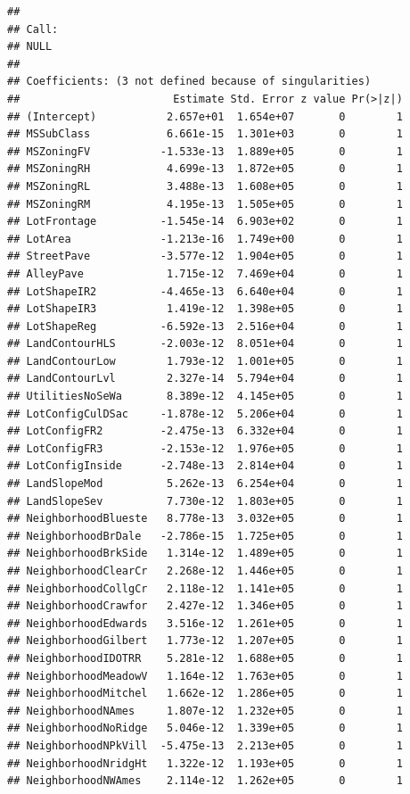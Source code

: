 \documentclass[
]{article}
\begin{document}
\begin{verbatim}
## 
## Call:
## NULL
## 
## Coefficients: (3 not defined because of singularities)
##                        Estimate Std. Error z value Pr(>|z|)
## (Intercept)           2.657e+01  1.654e+07       0        1
## MSSubClass            6.661e-15  1.301e+03       0        1
## MSZoningFV           -1.533e-13  1.889e+05       0        1
## MSZoningRH            4.699e-13  1.872e+05       0        1
## MSZoningRL            3.488e-13  1.608e+05       0        1
## MSZoningRM            4.195e-13  1.505e+05       0        1
## LotFrontage          -1.545e-14  6.903e+02       0        1
## LotArea              -1.213e-16  1.749e+00       0        1
## StreetPave           -3.577e-12  1.904e+05       0        1
## AlleyPave             1.715e-12  7.469e+04       0        1
## LotShapeIR2          -4.465e-13  6.640e+04       0        1
## LotShapeIR3           1.419e-12  1.398e+05       0        1
## LotShapeReg          -6.592e-13  2.516e+04       0        1
## LandContourHLS       -2.003e-12  8.051e+04       0        1
## LandContourLow        1.793e-12  1.001e+05       0        1
## LandContourLvl        2.327e-14  5.794e+04       0        1
## UtilitiesNoSeWa       8.389e-12  4.145e+05       0        1
## LotConfigCulDSac     -1.878e-12  5.206e+04       0        1
## LotConfigFR2         -2.475e-13  6.332e+04       0        1
## LotConfigFR3         -2.153e-12  1.976e+05       0        1
## LotConfigInside      -2.748e-13  2.814e+04       0        1
## LandSlopeMod          5.262e-13  6.254e+04       0        1
## LandSlopeSev          7.730e-12  1.803e+05       0        1
## NeighborhoodBlueste   8.778e-13  3.032e+05       0        1
## NeighborhoodBrDale   -2.786e-15  1.725e+05       0        1
## NeighborhoodBrkSide   1.314e-12  1.489e+05       0        1
## NeighborhoodClearCr   2.268e-12  1.446e+05       0        1
## NeighborhoodCollgCr   2.118e-12  1.141e+05       0        1
## NeighborhoodCrawfor   2.427e-12  1.346e+05       0        1
## NeighborhoodEdwards   3.516e-12  1.261e+05       0        1
## NeighborhoodGilbert   1.773e-12  1.207e+05       0        1
## NeighborhoodIDOTRR    5.281e-12  1.688e+05       0        1
## NeighborhoodMeadowV   1.164e-12  1.763e+05       0        1
## NeighborhoodMitchel   1.662e-12  1.286e+05       0        1
## NeighborhoodNAmes     1.807e-12  1.232e+05       0        1
## NeighborhoodNoRidge   5.046e-12  1.339e+05       0        1
## NeighborhoodNPkVill  -5.475e-13  2.213e+05       0        1
## NeighborhoodNridgHt   1.322e-12  1.193e+05       0        1
## NeighborhoodNWAmes    2.114e-12  1.262e+05       0        1

\end{verbatim}
\end{document}
